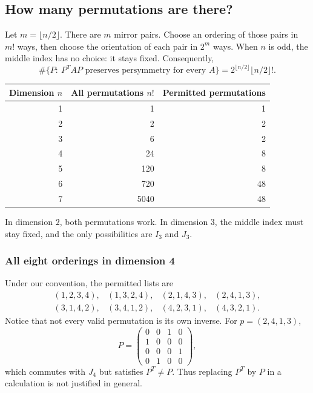 \documentclass[11pt,a4paper]{article}
\begin{document}
\subsection{How many permutations are there?}
Let $m=\lfloor n/2\rfloor$. There are $m$ mirror pairs. Choose an ordering
of those pairs in $m!$ ways, then choose the orientation of each pair in
$2^m$ ways. When $n$ is odd, the middle index has no choice: it stays fixed.
Consequently,
\[
 \boxed{\#\{P:\ P^TAP\text{ preserves persymmetry for every }A\}
 =2^{\lfloor n/2\rfloor}\lfloor n/2\rfloor!.}
\]
\begin{center}
\begin{tabular}{rrr}
\toprule
Dimension $n$ & All permutations $n!$ & Permitted permutations\\
\midrule
1&1&1\\2&2&2\\3&6&2\\4&24&8\\5&120&8\\6&720&48\\7&5040&48\\
\bottomrule
\end{tabular}
\end{center}
In dimension $2$, both permutations work. In dimension $3$, the middle
index must stay fixed, and the only possibilities are $I_3$ and $J_3$.

\subsubsection{All eight orderings in dimension 4}
Under our convention, the permitted lists are
\[
\begin{array}{llll}
(1,2,3,4),&(1,3,2,4),&(2,1,4,3),&(2,4,1,3),\\[2pt]
(3,1,4,2),&(3,4,1,2),&(4,2,3,1),&(4,3,2,1).
\end{array}
\]
Notice that not every valid permutation is its own inverse.
For $p=(2,4,1,3)$,
\[
 P=\begin{pmatrix}0&0&1&0\\1&0&0&0\\0&0&0&1\\0&1&0&0\end{pmatrix},
\]
which commutes with $J_4$ but satisfies $P^T\ne P$. Thus replacing $P^T$
by $P$ in a calculation is not justified in general.


\newpage
\end{document}
